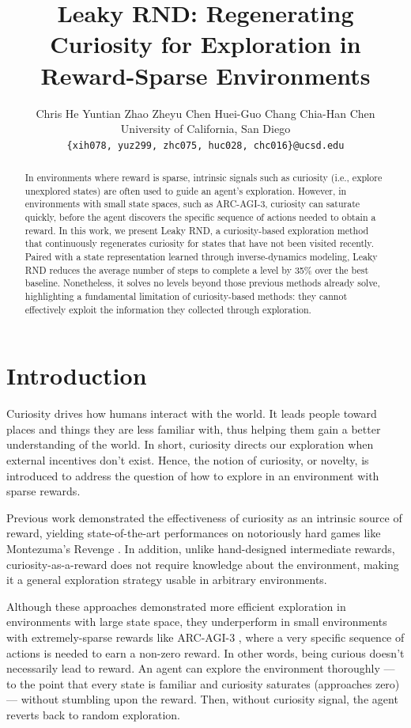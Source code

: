 \documentclass{article}
\title{Leaky RND: Regenerating Curiosity for Exploration in\\ Reward-Sparse Environments}
\author{%
  Chris He \quad Yuntian Zhao \quad Zheyu Chen \quad Huei-Guo Chang \quad Chia-Han Chen \\
  University of California, San Diego \\
  \texttt{\{xih078, yuz299, zhc075, huc028, chc016\}@ucsd.edu} \\
}
\begin{document}
\maketitle

\begin{abstract}
In environments where reward is sparse, intrinsic signals such as curiosity (i.e., explore unexplored states) are often used to guide an agent's exploration. However, in environments with small state spaces, such as ARC-AGI-3, curiosity can saturate quickly, before the agent discovers the specific sequence of actions needed to obtain a reward. In this work, we present Leaky RND, a curiosity-based exploration method that continuously regenerates curiosity for states that have not been visited recently. Paired with a state representation learned through inverse-dynamics modeling, Leaky RND reduces the average number of steps to complete a level by 35\% over the best baseline. Nonetheless, it solves no levels beyond those previous methods already solve, highlighting a fundamental limitation of curiosity-based methods: they cannot effectively exploit the information they collected through exploration.
\end{abstract}

\section{Introduction}
Curiosity drives how humans interact with the world. It leads people toward places and things they are less familiar with, thus helping them gain a better understanding of the world. In short, curiosity directs our exploration when external incentives don't exist. Hence, the notion of curiosity, or novelty, is introduced \citep{schmidhuber_formal_2010, meyer_possibility_1991} to address the question of how to explore in an environment with sparse rewards.

Previous work demonstrated the effectiveness of curiosity as an intrinsic source of reward, yielding state-of-the-art performances on notoriously hard games like Montezuma's Revenge \citep{burda_exploration_2018, pathak_curiosity-driven_2017}. In addition, unlike hand-designed intermediate rewards, curiosity-as-a-reward does not require knowledge about the environment, making it a general exploration strategy usable in arbitrary environments.

Although these approaches demonstrated more efficient exploration in environments with large state space, they underperform in small environments with extremely-sparse rewards like ARC-AGI-3 \citep{foundation_arc-agi-3_2026}, where a very specific sequence of actions is needed to earn a non-zero reward. In other words, being curious doesn't necessarily lead to reward. An agent can explore the environment thoroughly --- to the point that every state is familiar and curiosity saturates (approaches zero) \citep{yuan_intrinsically-motivated_2022} --- without stumbling upon the reward. Then, without curiosity signal, the agent reverts back to random exploration.
\end{document}

